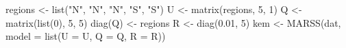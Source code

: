 \begin{Schunk}
\begin{Sinput}
 regions <- list("N", "N", "N", "S", "S")
 U <- matrix(regions, 5, 1)
 Q <- matrix(list(0), 5, 5)
 diag(Q) <- regions
 R <- diag(0.01, 5)
 kem <- MARSS(dat, model = list(U = U, Q = Q, R = R))
\end{Sinput}
\end{Schunk}

